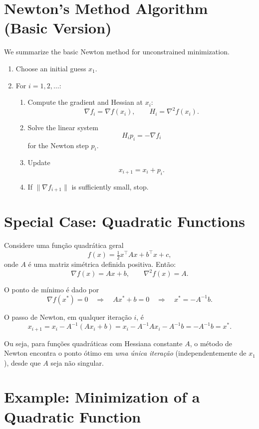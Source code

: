 \documentclass[9pt,a4paper]{extarticle}
\begin{document}
\section{Newton's Method Algorithm (Basic Version)}

We summarize the basic Newton method for unconstrained minimization.

\begin{enumerate}
    \item Choose an initial guess $x_1$.
    \item For $i = 1,2,\dots$:
    \begin{enumerate}
        \item Compute the gradient and Hessian at $x_i$:
        \[
        \nabla f_i = \nabla f(x_i),
        \qquad
        H_i = \nabla^2 f(x_i).
        \]
        \item Solve the linear system
        \[
        H_i p_i = - \nabla f_i
        \]
        for the Newton step $p_i$.
        \item Update
        \[
        x_{i+1} = x_i + p_i.
        \]
        \item If $\|\nabla f_{i+1}\|$ is sufficiently small, stop.
    \end{enumerate}
\end{enumerate}

\section{Special Case: Quadratic Functions}

Considere uma função quadrática geral
\[
f(x) = \tfrac12 x^\top A x + b^\top x + c,
\]
onde $A$ é uma matriz simétrica definida positiva. Então:
\[
\nabla f(x) = A x + b,
\qquad
\nabla^2 f(x) = A.
\]

O ponto de mínimo é dado por
\[
\nabla f(x^*) = 0
\quad\Longrightarrow\quad
A x^* + b = 0
\quad\Longrightarrow\quad
x^* = - A^{-1} b.
\]

O passo de Newton, em qualquer iteração $i$, é
\[
x_{i+1}
= x_i - A^{-1} (A x_i + b)
= x_i - A^{-1} A x_i - A^{-1} b
= - A^{-1} b
= x^*.
\]

Ou seja, para funções quadráticas com Hessiana constante $A$, o método de
Newton encontra o ponto ótimo em \emph{uma única iteração} (independentemente
de $x_1$), desde que $A$ seja não singular.

\section{Example: Minimization of a Quadratic Function}
\end{document}
